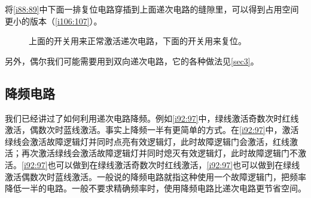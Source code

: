 将\autoref{i88:89}中下面一排复位电路穿插到上面递次电路的缝隙里，可以得到占用空间更小的版本（\autoref{i106:107}）。

\begin{figure}[!ht]
\begin{center}
\end{center}
\caption{上面的开关用来正常激活递次电路，下面的开关用来复位。}
\label{i106:107}
\end{figure}

另外，偶尔我们可能需要用到双向递次电路，它的各种做法见\autoref{sec3}。

\subsection{降频电路}\label{sec2:1}

我们已经讲过了如何利用递次电路降频。例如\autoref{i92:97}中，绿线激活奇数次时红线激活，偶数次时蓝线激活。事实上降频一半有更简单的方式。在\autoref{i92:97}中，激活绿线会激活故障逻辑灯并同时点亮有效逻辑灯，此时故障逻辑门会激活，红线激活；再次激活绿线会激活故障逻辑灯并同时熄灭有效逻辑灯，此时故障逻辑门不激活。\autoref{i92:97}也可以做到在绿线激活奇数次时红线激活，\autoref{i92:97}也可以做到在绿线激活偶数次时蓝线激活。一般说的降频电路就指这种使用一个故障逻辑门，把频率降低一半的电路。一般不要求精确频率时，使用降频电路比递次电路更节省空间。

